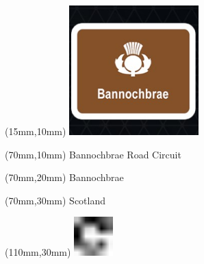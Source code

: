 \null\newpage
\begin{textblock*}{50mm}(15mm,10mm)%
\includegraphics[width=50mm]{LG/BANN.png}
\end{textblock*}
\begin{textblock*}{130mm}(70mm,10mm)%
{\fontsize{20}{20}\selectfont Bannochbrae Road Circuit}\\
\end{textblock*}
\begin{textblock*}{120mm}(70mm,20mm)%
{\fontsize{16}{16}\selectfont Bannochbrae}\\
\end{textblock*}
\begin{textblock*}{120mm}(70mm,30mm)%
{\fontsize{12}{12}\selectfont Scotland}
\end{textblock*}
\begin{textblock*}{30mm}(110mm,30mm)%
\centering
\includegraphics[height=15mm]{icons/fa-rotate-right.pdf}
\end{textblock*}
